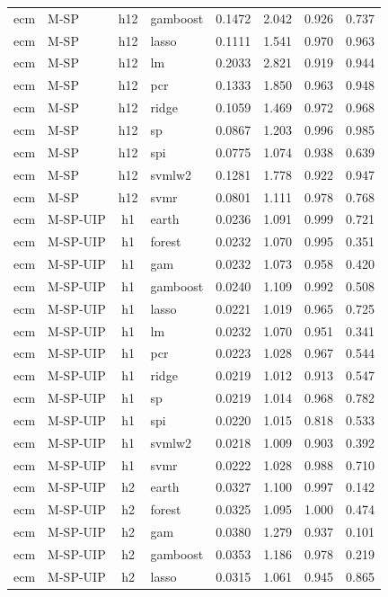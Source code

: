 \begin{ThreePartTable}
\begin{longtable}[t]{llclcccc}
ecm & M-SP & h12 & gamboost & 0.1472 & 2.042 & 0.926 & 0.737\\
ecm & M-SP & h12 & lasso & 0.1111 & 1.541 & 0.970 & 0.963\\
ecm & M-SP & h12 & lm & 0.2033 & 2.821 & 0.919 & 0.944\\
ecm & M-SP & h12 & pcr & 0.1333 & 1.850 & 0.963 & 0.948\\
ecm & M-SP & h12 & ridge & 0.1059 & 1.469 & 0.972 & 0.968\\
ecm & M-SP & h12 & sp & 0.0867 & 1.203 & 0.996 & 0.985\\
ecm & M-SP & h12 & spi & 0.0775 & 1.074 & 0.938 & 0.639\\
ecm & M-SP & h12 & svmlw2 & 0.1281 & 1.778 & 0.922 & 0.947\\
ecm & M-SP & h12 & svmr & 0.0801 & 1.111 & 0.978 & 0.768\\
\addlinespace
ecm & M-SP-UIP & h1 & earth & 0.0236 & 1.091 & 0.999 & 0.721\\
ecm & M-SP-UIP & h1 & forest & 0.0232 & 1.070 & 0.995 & 0.351\\
ecm & M-SP-UIP & h1 & gam & 0.0232 & 1.073 & 0.958 & 0.420\\
ecm & M-SP-UIP & h1 & gamboost & 0.0240 & 1.109 & 0.992 & 0.508\\
ecm & M-SP-UIP & h1 & lasso & 0.0221 & 1.019 & 0.965 & 0.725\\
ecm & M-SP-UIP & h1 & lm & 0.0232 & 1.070 & 0.951 & 0.341\\
ecm & M-SP-UIP & h1 & pcr & 0.0223 & 1.028 & 0.967 & 0.544\\
ecm & M-SP-UIP & h1 & ridge & 0.0219 & 1.012 & 0.913 & 0.547\\
ecm & M-SP-UIP & h1 & sp & 0.0219 & 1.014 & 0.968 & 0.782\\
ecm & M-SP-UIP & h1 & spi & 0.0220 & 1.015 & 0.818 & 0.533\\
ecm & M-SP-UIP & h1 & svmlw2 & 0.0218 & 1.009 & 0.903 & 0.392\\
ecm & M-SP-UIP & h1 & svmr & 0.0222 & 1.028 & 0.988 & 0.710\\
\addlinespace
ecm & M-SP-UIP & h2 & earth & 0.0327 & 1.100 & 0.997 & 0.142\\
ecm & M-SP-UIP & h2 & forest & 0.0325 & 1.095 & 1.000 & 0.474\\
ecm & M-SP-UIP & h2 & gam & 0.0380 & 1.279 & 0.937 & 0.101\\
ecm & M-SP-UIP & h2 & gamboost & 0.0353 & 1.186 & 0.978 & 0.219\\
ecm & M-SP-UIP & h2 & lasso & 0.0315 & 1.061 & 0.945 & 0.865\\

\end{longtable}
\end{ThreePartTable}
